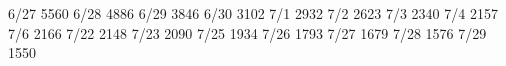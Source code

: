 6/27	5560
6/28	4886
6/29	3846
6/30	3102
7/1	2932
7/2	2623
7/3	2340
7/4  2157
7/6  2166
7/22 2148
7/23 2090
7/25 1934
7/26 1793
7/27 1679
7/28 1576
7/29 1550